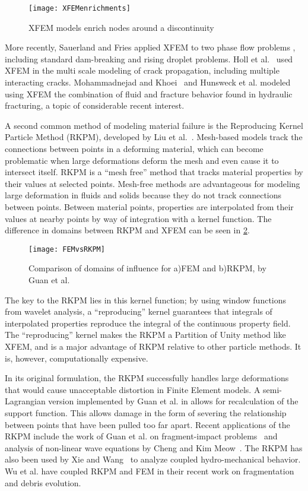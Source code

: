 %
\begin{figure}[h]
  \centering
\texttt{[image: XFEMenrichments]}
\caption[XFEM models enrich nodes around a discontinuity]{XFEM models enrich nodes around a discontinuity\cite{fries2010extended}}
\label{fig:XFEM}
\end{figure}
%

More recently, Sauerland and Fries applied XFEM to two phase flow problems \cite{sauerland2013stable}, including standard dam-breaking and rising droplet problems.
Holl et al.~\cite{holl2013adaptive} used XFEM in the multi scale modeling of crack propagation, including multiple interacting cracks.
Mohammadnejad and Khoei~\cite{mohammadnejad2013hydro} and Hunsweck et al. \cite{hunsweck2013finite} modeled using XFEM the combination of fluid and fracture behavior found in hydraulic fracturing, a topic of considerable recent interest.

A second common method of modeling material failure is the Reproducing Kernel Particle Method (RKPM), developed by Liu et al.~\cite{liu1995reproducing}.
Mesh-based models track the connections between points in a deforming material, which can become problematic when large deformations deform the mesh and even cause it to intersect itself.
RKPM is a ``mesh free'' method that tracks material properties by their values at selected points.
Mesh-free methods are advantageous for modeling large deformation in fluids and solids because they do not track connections between points.
Between material points, properties are interpolated from their values at nearby points by way of integration with a kernel function.
The difference in domains between RKPM and XFEM can be seen in \cref{fig:FEMvsRKPM}.
%
\begin{figure}[h]
  \centering
\texttt{[image: FEMvsRKPM]}
\caption[Comparison of domains of influence for FEM and RKPM]{Comparison of domains of influence for a)FEM and b)RKPM, by Guan et al. \cite{guan2011semi}}
\label{fig:FEMvsRKPM}
\end{figure}
%
The key to the RKPM lies in this kernel function; by using window functions from wavelet analysis, a ``reproducing'' kernel guarantees that  integrals of interpolated properties reproduce the integral of the continuous property field.
The ``reproducing'' kernel makes the RKPM a Partition of Unity method like XFEM, and is a major advantage of RKPM relative to other particle methods.
It is, however, computationally expensive.

In its original formulation, the RKPM successfully handles large deformations that would cause unacceptable distortion in Finite Element models.
A semi-Lagrangian version implemented by Guan et al. in \cite{guan2009semi} allows for recalculation of the support function.
This allows damage in the form of severing the relationship between points that have been pulled too far apart.
Recent applications of the RKPM include the work of Guan et al. on fragment-impact problems~\cite{guan2011semi} and analysis of non-linear wave equations by Cheng and Kim Meow~\cite{cheng2012analyzing}.
The RKPM has also been used by Xie and Wang~\cite{xie2014stabilized} to analyze coupled hydro-mechanical behavior.
Wu et al. have coupled RKPM and FEM in their recent work on fragmentation and debris evolution\cite{wu2014fragmentation}.

